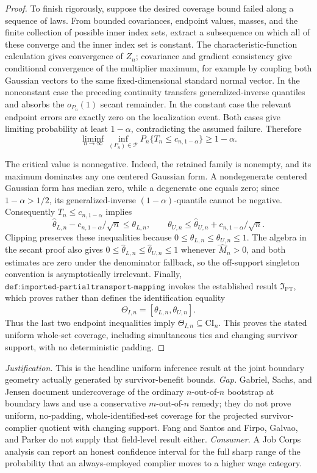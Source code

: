 \documentclass{article}
\begin{document}
\begin{proof}
To finish rigorously, suppose the desired coverage bound failed along a sequence of laws. From bounded covariances, endpoint values, masses, and the finite collection of possible inner index sets, extract a subsequence on which all of these converge and the inner index set is constant. The characteristic-function calculation gives convergence of \(Z_n\); covariance and gradient consistency give conditional convergence of the multiplier maximum, for example by coupling both Gaussian vectors to the same fixed-dimensional standard normal vector. In the nonconstant case the preceding continuity transfers generalized-inverse quantiles and absorbs the \(o_{P_n}(1)\) secant remainder. In the constant case the relevant endpoint errors are exactly zero on the localization event. Both cases give limiting probability at least \(1-\alpha\), contradicting the assumed failure. Therefore
\[
 \liminf_{n\to\infty}\inf_{(P_n)\in\mathcal P}
 P_n\{T_n\le c_{n,1-\alpha}\}\ge1-\alpha.
\]

The critical value is nonnegative. Indeed, the retained family is nonempty, and its maximum dominates any one centered Gaussian form. A nondegenerate centered Gaussian form has median zero, while a degenerate one equals zero; since \(1-\alpha>1/2\), its generalized-inverse \((1-\alpha)\)-quantile cannot be negative. Consequently \(T_n\le c_{n,1-\alpha}\) implies
\[
 \widehat\theta_{L,n}-c_{n,1-\alpha}/\sqrt n\le\theta_{L,n},
 \qquad
 \theta_{U,n}\le\widehat\theta_{U,n}+c_{n,1-\alpha}/\sqrt n.
\]
Clipping preserves these inequalities because \(0\le\theta_{L,n}\le\theta_{U,n}\le1\). The algebra in the secant proof also gives
\(0\le\widehat\theta_{L,n}\le\widehat\theta_{U,n}\le1\) whenever \(\widehat M_n>0\), and both estimates are zero under the denominator fallback, so the off-support singleton convention is asymptotically irrelevant. Finally, \(\texttt{def:imported-partialtransport-mapping}\) invokes the established result \(\mathfrak I_{\mathrm{PT}}\), which proves rather than defines the identification equality
\[
 \Theta_{I,n}=[\theta_{L,n},\theta_{U,n}].
\]
Thus the last two endpoint inequalities imply \(\Theta_{I,n}\subseteq\mathrm{CI}_n\). This proves the stated uniform whole-set coverage, including simultaneous ties and changing survivor support, with no deterministic padding.
\end{proof}
\par\smallskip\noindent \textit{Justification.} This is the headline uniform inference result at the joint boundary geometry actually generated by survivor-benefit bounds. \textit{Gap.} Gabriel, Sachs, and Jensen document undercoverage of the ordinary \(n\)-out-of-\(n\) bootstrap at boundary laws and use a conservative \(m\)-out-of-\(n\) remedy; they do not prove uniform, no-padding, whole-identified-set coverage for the projected survivor-complier quotient with changing support. Fang and Santos and Firpo, Galvao, and Parker do not supply that field-level result either. \textit{Consumer.} A Job Corps analysis can report an honest confidence interval for the full sharp range of the probability that an always-employed complier moves to a higher wage category.
\end{document}
